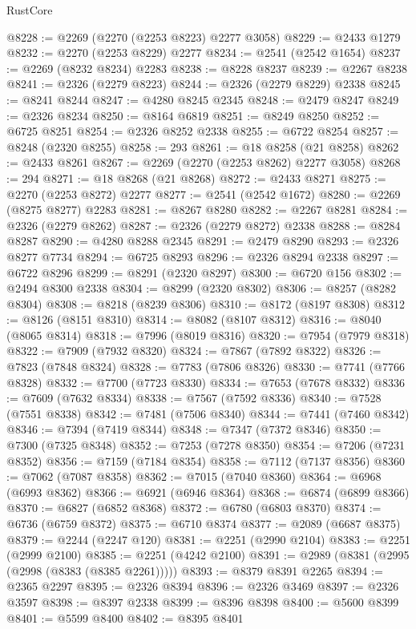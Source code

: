 \begin{lexlean}{RustCore}
\begin{coremodule}
@8228 := @2269 (@2270 (@2253 @8223) @2277 @3058)
@8229 := @2433 @1279
@8232 := @2270 (@2253 @8229) @2277
@8234 := @2541 (@2542 @1654)
@8237 := @2269 (@8232 @8234) @2283
@8238 := @8228 @8237
@8239 := @2267 @8238
@8241 := @2326 (@2279 @8223)
@8244 := @2326 (@2279 @8229) @2338
@8245 := @8241 @8244
@8247 := @4280 @8245 @2345
@8248 := @2479 @8247
@8249 := @2326 @8234
@8250 := @8164 @6819
@8251 := @8249 @8250
@8252 := @6725 @8251
@8254 := @2326 @8252 @2338
@8255 := @6722 @8254
@8257 := @8248 (@2320 @8255)
@8258 := 293
@8261 := @18 @8258 (@21 @8258)
@8262 := @2433 @8261
@8267 := @2269 (@2270 (@2253 @8262) @2277 @3058)
@8268 := 294
@8271 := @18 @8268 (@21 @8268)
@8272 := @2433 @8271
@8275 := @2270 (@2253 @8272) @2277
@8277 := @2541 (@2542 @1672)
@8280 := @2269 (@8275 @8277) @2283
@8281 := @8267 @8280
@8282 := @2267 @8281
@8284 := @2326 (@2279 @8262)
@8287 := @2326 (@2279 @8272) @2338
@8288 := @8284 @8287
@8290 := @4280 @8288 @2345
@8291 := @2479 @8290
@8293 := @2326 @8277 @7734
@8294 := @6725 @8293
@8296 := @2326 @8294 @2338
@8297 := @6722 @8296
@8299 := @8291 (@2320 @8297)
@8300 := @6720 @156
@8302 := @2494 @8300 @2338
@8304 := @8299 (@2320 @8302)
@8306 := @8257 (@8282 @8304)
@8308 := @8218 (@8239 @8306)
@8310 := @8172 (@8197 @8308)
@8312 := @8126 (@8151 @8310)
@8314 := @8082 (@8107 @8312)
@8316 := @8040 (@8065 @8314)
@8318 := @7996 (@8019 @8316)
@8320 := @7954 (@7979 @8318)
@8322 := @7909 (@7932 @8320)
@8324 := @7867 (@7892 @8322)
@8326 := @7823 (@7848 @8324)
@8328 := @7783 (@7806 @8326)
@8330 := @7741 (@7766 @8328)
@8332 := @7700 (@7723 @8330)
@8334 := @7653 (@7678 @8332)
@8336 := @7609 (@7632 @8334)
@8338 := @7567 (@7592 @8336)
@8340 := @7528 (@7551 @8338)
@8342 := @7481 (@7506 @8340)
@8344 := @7441 (@7460 @8342)
@8346 := @7394 (@7419 @8344)
@8348 := @7347 (@7372 @8346)
@8350 := @7300 (@7325 @8348)
@8352 := @7253 (@7278 @8350)
@8354 := @7206 (@7231 @8352)
@8356 := @7159 (@7184 @8354)
@8358 := @7112 (@7137 @8356)
@8360 := @7062 (@7087 @8358)
@8362 := @7015 (@7040 @8360)
@8364 := @6968 (@6993 @8362)
@8366 := @6921 (@6946 @8364)
@8368 := @6874 (@6899 @8366)
@8370 := @6827 (@6852 @8368)
@8372 := @6780 (@6803 @8370)
@8374 := @6736 (@6759 @8372)
@8375 := @6710 @8374
@8377 := @2089 (@6687 @8375)
@8379 := @2244 (@2247 @120)
@8381 := @2251 (@2990 @2104)
@8383 := @2251 (@2999 @2100)
@8385 := @2251 (@4242 @2100)
@8391 := @2989 (@8381 (@2995 (@2998 (@8383 (@8385 @2261)))))
@8393 := @8379 @8391 @2265
@8394 := @2365 @2297
@8395 := @2326 @8394
@8396 := @2326 @3469
@8397 := @2326 @3597
@8398 := @8397 @2338
@8399 := @8396 @8398
@8400 := @5600 @8399
@8401 := @5599 @8400
@8402 := @8395 @8401

\end{coremodule}
\end{lexlean}
